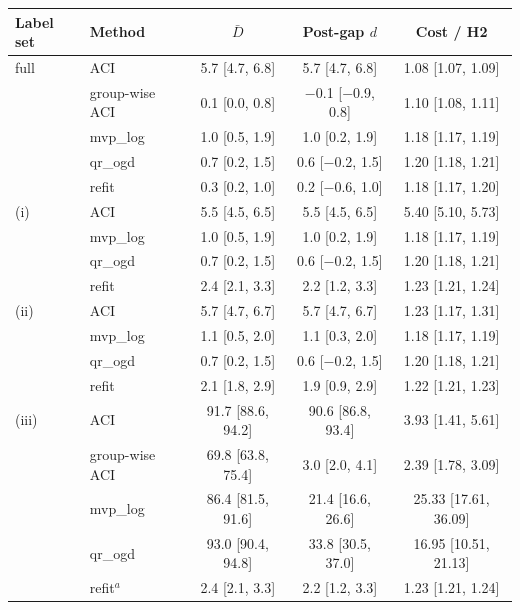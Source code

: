 \begin{tabular}{@{}llccc@{}}
\toprule
Label set & Method & $\bar{D}$ & Post-gap $d$ & Cost / H2 \\
\midrule
full & ACI & 5.7 [4.7, 6.8] & 5.7 [4.7, 6.8] & 1.08 [1.07, 1.09] \\
 & group-wise ACI & 0.1 [0.0, 0.8] & $-$0.1 [$-$0.9, 0.8] & 1.10 [1.08, 1.11] \\
 & mvp\_log & 1.0 [0.5, 1.9] & 1.0 [0.2, 1.9] & 1.18 [1.17, 1.19] \\
 & qr\_ogd & 0.7 [0.2, 1.5] & 0.6 [$-$0.2, 1.5] & 1.20 [1.18, 1.21] \\
 & refit & 0.3 [0.2, 1.0] & 0.2 [$-$0.6, 1.0] & 1.18 [1.17, 1.20] \\
\addlinespace
(i) & ACI & 5.5 [4.5, 6.5] & 5.5 [4.5, 6.5] & 5.40 [5.10, 5.73] \\
 & mvp\_log & 1.0 [0.5, 1.9] & 1.0 [0.2, 1.9] & 1.18 [1.17, 1.19] \\
 & qr\_ogd & 0.7 [0.2, 1.5] & 0.6 [$-$0.2, 1.5] & 1.20 [1.18, 1.21] \\
 & refit & 2.4 [2.1, 3.3] & 2.2 [1.2, 3.3] & 1.23 [1.21, 1.24] \\
\addlinespace
(ii) & ACI & 5.7 [4.7, 6.7] & 5.7 [4.7, 6.7] & 1.23 [1.17, 1.31] \\
 & mvp\_log & 1.1 [0.5, 2.0] & 1.1 [0.3, 2.0] & 1.18 [1.17, 1.19] \\
 & qr\_ogd & 0.7 [0.2, 1.5] & 0.6 [$-$0.2, 1.5] & 1.20 [1.18, 1.21] \\
 & refit & 2.1 [1.8, 2.9] & 1.9 [0.9, 2.9] & 1.22 [1.21, 1.23] \\
\addlinespace
(iii) & ACI & 91.7 [88.6, 94.2] & 90.6 [86.8, 93.4] & 3.93 [1.41, 5.61] \\
 & group-wise ACI & 69.8 [63.8, 75.4] & 3.0 [2.0, 4.1] & 2.39 [1.78, 3.09] \\
 & mvp\_log & 86.4 [81.5, 91.6] & 21.4 [16.6, 26.6] & 25.33 [17.61, 36.09] \\
 & qr\_ogd & 93.0 [90.4, 94.8] & 33.8 [30.5, 37.0] & 16.95 [10.51, 21.13] \\
 & refit$^a$ & 2.4 [2.1, 3.3] & 2.2 [1.2, 3.3] & 1.23 [1.21, 1.24] \\

\end{tabular}
